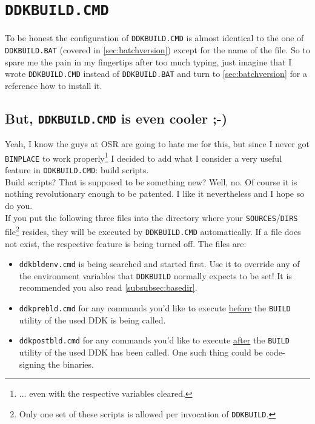 \documentclass[a4paper,titlepage]{report}
\begin{document}
\section{\texttt{DDKBUILD.CMD}}
\label{sec:ntscriptversion}
To be honest the configuration of \texttt{DDKBUILD.CMD} is almost identical to the one of
\texttt{DDKBUILD.BAT} (covered in \autoref{sec:batchversion}) except for the name of the file.
So to spare me the pain in my fingertips after too much typing, just imagine that I
wrote \texttt{DDKBUILD.CMD} instead of \texttt{DDKBUILD.BAT} and turn to \autoref{sec:batchversion}
for a reference how to install it.

\subsection{But, \texttt{DDKBUILD.CMD} is even cooler \textsf{;-)}}
\label{subsec:buildscripts}
Yeah, I know the guys at OSR are going to hate me for this, but since I never got \texttt{BINPLACE}
to work properly\footnote{... even with the respective variables cleared.} I decided to
add what I consider a very useful feature in \texttt{DDKBUILD.CMD}: build scripts.\\

Build scripts? That is supposed to be something new? Well, no. Of course it is nothing
revolutionary enough to be patented. I like it nevertheless and I hope so do you.\\

If you put the following three files into the directory where your \texttt{SOURCES}/\texttt{DIRS}
file\footnote{Only one set of these scripts is allowed per invocation of \texttt{DDKBUILD}.}
resides, they will be executed by \texttt{DDKBUILD.CMD} automatically.
If a file does not exist, the respective feature is being turned off. The files are:
\begin{itemize}
  \item \texttt{ddkbldenv.cmd} is being searched and started first. Use it to override any of the environment
  variables that \texttt{DDKBUILD} normally expects to be set! It is recommended you also read \autoref{subsubsec:basedir}.
  \item \texttt{ddkprebld.cmd} for any commands you'd like to execute \underline{before} the \texttt{BUILD}
  utility of the used DDK is being called.
  \item \texttt{ddkpostbld.cmd} for any commands you'd like to execute \underline{after} the \texttt{BUILD}
  utility of the used DDK has been called. One such thing could be code-signing the binaries.
\end{itemize}
\end{document}
